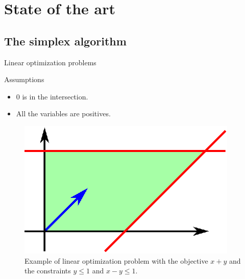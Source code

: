 \section{State of the art}
\subsection{The simplex algorithm}

\begin{frame}{Linear optimization problems}
\begin{block}{Assumptions}
\begin{itemize}
\item $0$ is in the intersection.
\item All the variables are positives.
\end{itemize}
\end{block}
\begin{figure}
\includegraphics[scale=1]{images/simplex1.eps}\\
Example of linear optimization problem with the objective $x+y$ and the constraints $y\leq 1$ and $x-y\leq 1$.
\end{figure}
\end{frame}

